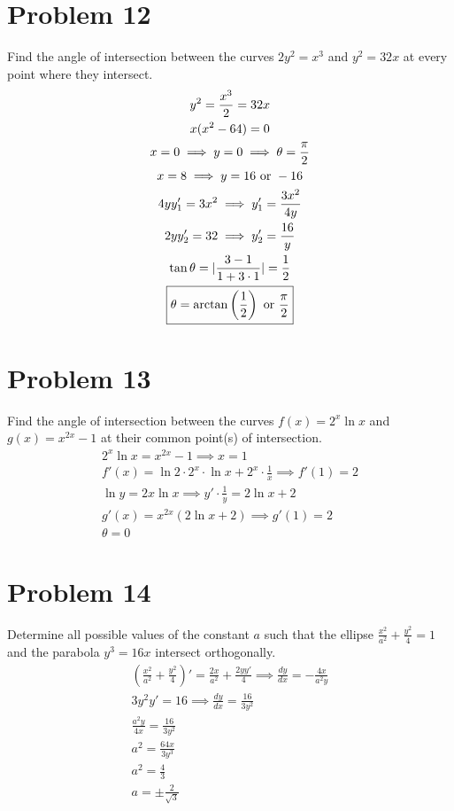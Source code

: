 \documentclass[12pt]{article}
\newcommand*{\paren}[1]{\ensuremath\left(#1\right)}
\newcommand{\dydx}{\frac{dy}{dx}}
\newcommand{\tor}{\text{ or }}
\newcommand{\problem}[1]{\section{Problem #1}}
\begin{document}
\problem{12}
Find the angle of intersection between the curves $2y^2 = x^3$ and $y^2 = 32x$ at every point where they
intersect.
\begin{gather*}
    y^2=\frac{x^3}{2}=32x\\
    x(x^2-64)=0\\
    x=0\implies y=0 \implies \theta =\frac{\pi}{2}\\   
    x=8 \implies y=16 \tor -16\\
    4yy_1'=3x^2 \implies y_1'=\frac{3x^2}{4y}\\
    2yy_2'=32 \implies y_2'=\frac{16}{y}\\
    \tan \theta = |\frac{3-1}{1+3\cdot 1}|=\frac{1}{2}\\
    \boxed{\theta = \arctan \paren{\frac{1}{2}} \tor \frac{\pi}{2}}
\end{gather*}

\problem{13}
Find the angle of intersection between the curves $f (x) = 2^x \ln x$ and $g(x) = x^{2x} - 1$ at their common point(s) of intersection.
\begin{gather*}
    2^x \ln x=x^{2x}-1 \implies x=1\\
    f'(x)=\ln 2 \cdot 2^x\cdot \ln x + 2^x \cdot \frac{1}{x} \implies f'(1)=2\\
    \ln y=2x\ln x\implies y'\cdot \frac{1}{y}=2\ln x+2\\
    g'(x)=x^{2x}(2 \ln x+2) \implies g'(1)=2\\
    \boxed{\theta = 0}
\end{gather*}

\problem{14}
Determine all possible values of the constant $a$ such that the ellipse $\frac{x^2}{a^2} + \frac{y^2}{4} = 1$ and the parabola $y^3 = 16x$ intersect orthogonally.
\begin{gather*}
    (\frac{x^2}{a^2} + \frac{y^2}{4})'=\frac{2x}
    {a^2}+\frac{2yy'}{4} \implies \dydx =-\frac{4x}{a^2y}\\
    3y^2y'=16 \implies \dydx =\frac{16}{3y^2}\\
    \frac{a^2y}{4x}=\frac{16}{3y^2} \\
    a^2=\frac{64x}{3y^3}\\
    a^2=\frac{4}{3}\\
    \boxed{a=\pm \frac{2}{\sqrt{3}}}
\end{gather*}
\end{document}
